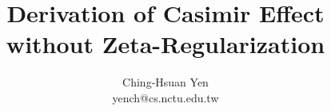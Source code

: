 \documentclass[twocolumn]{revtex4-2}
\begin{document}
\title{Derivation of Casimir Effect without Zeta-Regularization}
\author{Ching-Hsuan Yen \\ yench@cs.nctu.edu.tw }
\begin{abstract}
    
\end{abstract}
\maketitle





\end{document}
